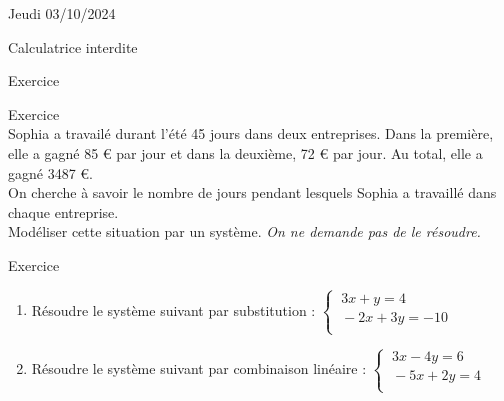 \documentclass[a4paper,11pt,eval]{nsi}
\newcounter{exoNum}
\newcommand{\exo}[1]
{
	\addtocounter{exoNum}{1}
	{\titlefont\color{UGLiBlue}\Large Exercice\ \theexoNum\ \normalsize{#1}}\smallskip	
}
\begin{document}
\textcolor{UGLiBlue}{Jeudi 03/10/2024}\\
\maketitle
\begin{center}
	Calculatrice interdite
\end{center}

\exo{}\\
{
    \def\xmin{-5}	\def\xmax{7}	\def\ymin{-5}	\def\ymax{7}
}

\exo{}\\
Sophia a travailé durant l'été 45 jours dans deux entreprises. Dans la première, elle a gagné 85 € par jour et dans la deuxième, 72 € par jour. Au total, elle a gagné 3487 €.\\
On cherche à savoir le nombre de jours pendant lesquels Sophia a travaillé dans chaque entreprise.\\[.5em]
Modéliser cette situation par un système. \textit{On ne demande pas de le résoudre.}\\[.5em]

\exo{}
    \begin{enumerate}
        \item Résoudre le système suivant par substitution : $\left\{
			\begin{array}{l}
				\ 3x+y=4 \\
				\ -2x+3y=-10 \\
			\end{array} \right.$
        \item Résoudre le système suivant par combinaison linéaire : $\left\{
			\begin{array}{l}
				\ 3x-4y=6 \\
				\ -5x+2y=4 \\
			\end{array} \right.$
    \end{enumerate}
\end{document}
